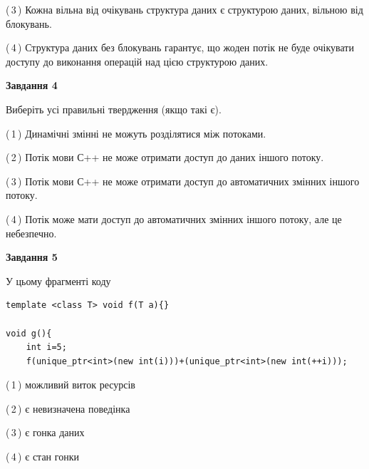 \documentclass[12pt, ukrainian]{article}
\begin{document}
\begin {large}
{(\,3\,) Кожна вільна від очікувань структура даних є структурою даних, вільною від блокувань.%

(\,4\,) Структура даних без блокувань гарантує, що жоден потік не буде очікувати доступу до виконання операцій над цією структурою даних.%



\begin{center}
\textbf{Завдання 4}
\end{center}
Виберіть усі правильні твердження (якщо такі є).\par
\vspace{2mm}

(\,1\,) Динамічні змінні не можуть розділятися між потоками.%

(\,2\,) Потік мови С++ не може отримати доступ до даних іншого потоку.%

(\,3\,) Потік мови С++ не може отримати доступ до автоматичних змінних іншого потоку.%

(\,4\,) Потік може мати доступ до автоматичних змінних іншого потоку, але це небезпечно.%



\begin{center}
\textbf{Завдання 5}
\end{center}
У цьому фрагменті коду
\begin{verbatim}
template <class T> void f(T a){}

void g(){
    int i=5;
    f(unique_ptr<int>(new int(i)))+(unique_ptr<int>(new int(++i)));
\end{verbatim}
(\,1\,) можливий виток ресурсів%

(\,2\,) є невизначена поведінка%

(\,3\,) є гонка даних%

(\,4\,) є стан гонки%


}
\end {large}
\end{document}
